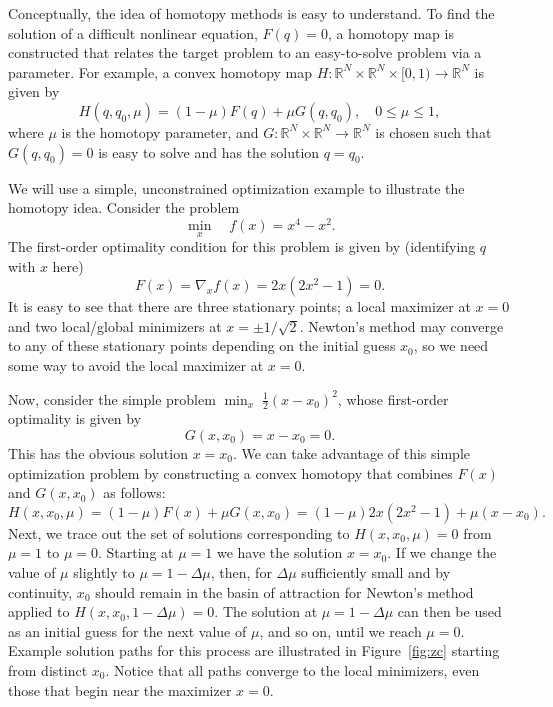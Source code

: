 Conceptually, the idea of homotopy methods is easy to understand. To find the
solution of a difficult nonlinear equation, $F(q)=0$, a homotopy map is
constructed that relates the target problem to an easy-to-solve problem via a
parameter.  For example, a convex homotopy map $H : \mathbb{R}^N \times
\mathbb{R}^{N} \times [0,1) \rightarrow \mathbb{R}^N$ is given by
\begin{equation}\label{eq:homotopy}
H(q, q_0, \mu) = (1-\mu) F(q) + \mu G(q,q_0),\quad 0 \leq \mu \leq 1,
\end{equation}
where $\mu$ is the homotopy parameter, and $G : \mathbb{R}^N\times\mathbb{R}^{N}
\rightarrow \mathbb{R}^N$ is chosen such that $G(q,q_0)=0$ is easy to solve and
has the solution $q=q_0$.  %

We will use a simple, unconstrained optimization example to illustrate the
homotopy idea. Consider the problem
\begin{equation*}
\min_x  \quad  f(x) = x^4 - x^2.
\end{equation*}
The first-order optimality condition for this problem is given by (identifying
$q$ with $x$ here)
\begin{equation*}
F(x) = \nabla_x f(x) = 2x(2x^2 - 1) = 0.
\end{equation*}
It is easy to see that there are three stationary points; a local maximizer at
$x=0$ and two local/global minimizers at $x=\pm 1/\sqrt{2}$.  Newton's method
may converge to any of these stationary points depending on the initial guess
$x_0$, so we need some way to avoid the local maximizer at $x=0$.

Now, consider the simple problem $\min_x \; \frac{1}{2}(x - x_0)^2$, whose
first-order optimality is given by
\begin{equation*}
G(x,x_0) = x - x_0 = 0.
\end{equation*}
This has the obvious solution $x=x_0$.  We can take advantage of this simple
optimization problem by constructing a convex homotopy that combines $F(x)$ and
$G(x,x_0)$ as follows:
\begin{equation*}
  H(x, x_0, \mu) = (1-\mu) F(x) + \mu G(x, x_0) = (1 - \mu) 2x(2x^2 -1) + \mu (x
  - x_0).
\end{equation*}
Next, we trace out the set of solutions corresponding to $H(x,x_0,\mu)=0$ from
$\mu=1$ to $\mu=0$.  Starting at $\mu=1$ we have the solution $x=x_0$.  If we
change the value of $\mu$ slightly to $\mu = 1 - \Delta \mu$, then, for $\Delta
\mu$ sufficiently small and by continuity, $x_0$ should remain in the basin of
attraction for Newton's method applied to $H(x, x_0, 1-\Delta \mu)=0$.  The
solution at $\mu= 1 - \Delta \mu$ can then be used as an initial guess for the
next value of $\mu$, and so on, until we reach $\mu = 0$.  Example solution
paths for this process are illustrated in Figure~\ref{fig:zc} starting from
distinct $x_0$.  Notice that all paths converge to the local minimizers, even
those that begin near the maximizer $x=0$.

